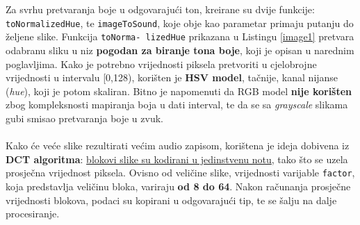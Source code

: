 \documentclass[12pt,a4paper]{article}
\begin{document}
Za svrhu pretvaranja boje u odgovarajući ton, kreirane su dvije funkcije: \texttt{toNormalizedHue}, te \texttt{imageToSound}, koje obje kao parametar primaju putanju do željene slike. Funkcija \texttt{toNorma- lizedHue} prikazana u Listingu \ref{image1} pretvara odabranu sliku u niz \textbf{pogodan za biranje tona boje}, koji je opisan u narednim poglavljima. Kako je potrebno vrijednosti piksela pretvoriti u cjelobrojne vrijednosti u intervalu [0,128), korišten je \textbf{HSV model}, tačnije, kanal nijanse (\textit{hue}), koji je potom skaliran. Bitno je napomenuti da RGB model \textbf{nije korišten} zbog kompleksnosti mapiranja boja u dati interval, te da se sa \textit{grayscale} slikama gubi smisao pretvaranja boje u zvuk. \\
~\\
Kako će veće slike rezultirati većim audio zapisom, korištena je ideja dobivena iz \textbf{DCT algoritma}: \underline{blokovi slike su kodirani u jedinstvenu notu}, tako što se uzela prosječna vrijednost piksela. Ovisno od veličine slike, vrijednosti varijable \texttt{factor}, koja predstavlja veličinu bloka, variraju \textbf{od 8 do 64}. Nakon računanja prosječne vrijednosti blokova, podaci su kopirani u odgovarajući tip, te se šalju na dalje procesiranje.
\end{document}
